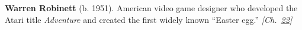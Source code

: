 \textbf{Warren Robinett} (b. 1951). American video game designer who developed the Atari title \emph{Adventure} and created the first widely known ``Easter egg.'' \emph{[Ch.~\hyperref[ch:minecraftcreeper]{22}]}


